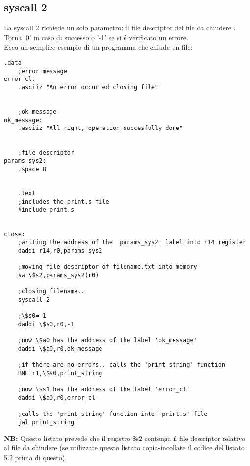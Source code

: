 \documentclass[12pt]{report}
\newcommand{\OF}{\textbf{NB:} Questo listato prevede che il registro \$s2 contenga il file descriptor
relativo al file da chiudere (se utilizzate questo listato copia-incollate il codice del listato 5.2 prima di questo).}
\begin{document}
\subsection{syscall 2}
La syscall 2 richiede un solo parametro: il file descriptor del file da chiudere .\\
Torna '0' in caso di successo o '-1' se si \'{e} verificato un errore.\\ 
Ecco un semplice esempio di un programma che chiude un file:
\begin{lstlisting}[caption={syscall2}, label={code:syscall2}, style={mips}]
      		.data
	;error message
error_cl:	
	.asciiz "An error occurred closing file"

	
	;ok message
ok_message:	
	.asciiz "All right, operation succesfully done"	


	;file descriptor
params_sys2:	
	.space 8					


	.text
	;includes the print.s file
	#include print.s	


close:	
	;writing the address of the 'params_sys2' label into r14 register	
	daddi r14,r0,params_sys2		

	;moving file descriptor of filename.txt into memory
	sw \$s2,params_sys2(r0)	

	;closing filename..	
	syscall 2			

	;\$s0=-1
	daddi \$s0,r0,-1		

	;now \$a0 has the address of the label 'ok_message'		
	daddi \$a0,r0,ok_message		
	
	;if there are no errors.. calls the 'print_string' function
	BNE r1,\$s0,print_string		

	;now \$s1 has the address of the label 'error_cl'
	daddi \$a0,r0,error_cl

	;calls the 'print_string' function into 'print.s' file			
	jal print_string				

\end{lstlisting}
\OF{}
\end{document}
